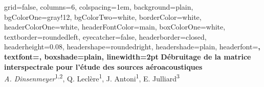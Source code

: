 \documentclass[portrait,final,a0paper,]{baposter}
\begin{document}


\begin{poster}%
  {
  grid=false,
  columns=6,
  colspacing=1em,
  background=plain,%
  bgColorOne=gray!12,%
  bgColorTwo=white,
  borderColor=white,%
  headerColorOne=white,%
  headerFontColor=main,%
  boxColorOne=white,%
  textborder=roundedleft,%
  eyecatcher=false,
  headerborder=closed,
  headerheight=0.08\textheight,
  headershape=roundedright,
  headershade=plain,%
  headerfont=\Large\bfseries,%
  textfont={\setlength{\parindent}{1.5em}},
  boxshade=plain,
  linewidth=2pt
  }
  {  }
 {
\vspace{0.4cm}\textcolor{main}{\textbf{Débruitage de la matrice interspectrale pour l'étude des sources aéroacoustiques}}}
  { ~\\ \textit{A. Dinsenmeyer}\textsuperscript{1,2}, Q. Leclère\textsuperscript{1}, J. Antoni\textsuperscript{1}, E. Julliard\textsuperscript{3}}
  {  }
  

\end{poster}
\end{document}
